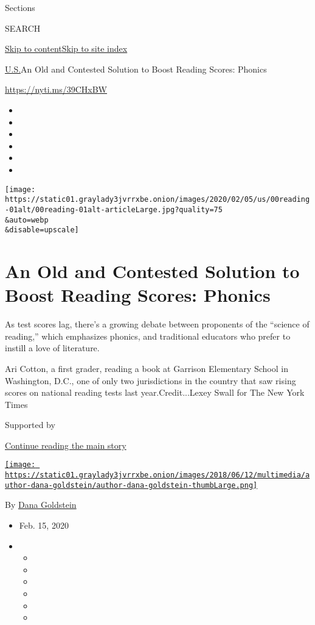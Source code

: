 Sections

SEARCH

\protect\hyperlink{site-content}{Skip to
content}\protect\hyperlink{site-index}{Skip to site index}

\href{/section/us}{U.S.}\textbar{}An Old and Contested Solution to Boost
Reading Scores: Phonics

\url{https://nyti.ms/39CHxBW}

\begin{itemize}
\item
\item
\item
\item
\item
\item
\end{itemize}

\texttt{[image: https://static01.graylady3jvrrxbe.onion/images/2020/02/05/us/00reading-01alt/00reading-01alt-articleLarge.jpg?quality=75\\\&auto=webp\\\&disable=upscale]}

\hypertarget{an-old-and-contested-solution-to-boost-reading-scores-phonics}{%
\section{An Old and Contested Solution to Boost Reading Scores:
Phonics}\label{an-old-and-contested-solution-to-boost-reading-scores-phonics}}

As test scores lag, there's a growing debate between proponents of the
``science of reading,'' which emphasizes phonics, and traditional
educators who prefer to instill a love of literature.

Ari Cotton, a first grader, reading a book at Garrison Elementary School
in Washington, D.C., one of only two jurisdictions in the country that
saw rising scores on national reading tests last year.Credit...Lexey
Swall for The New York Times

Supported by

\protect\hyperlink{after-sponsor}{Continue reading the main story}

\href{https://www.nytimes3xbfgragh.onion/by/dana-goldstein}{\texttt{[image: https://static01.graylady3jvrrxbe.onion/images/2018/06/12/multimedia/author-dana-goldstein/author-dana-goldstein-thumbLarge.png]}}

By \href{https://www.nytimes3xbfgragh.onion/by/dana-goldstein}{Dana
Goldstein}

\begin{itemize}
\item
  Feb. 15, 2020
\item
  \begin{itemize}
  \item
  \item
  \item
  \item
  \item
  \item
  \end{itemize}
\end{itemize}

